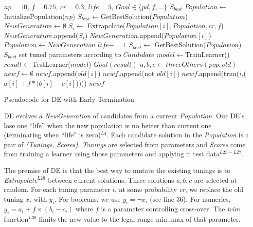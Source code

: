 \begin{algorithm}[!t]
\scriptsize
\begin{algorithmic}[1]
\Require $\mathit{np} = 10$, $f=0.75$, $cr=0.3$, $\mathit{life} = 5$, $\mathit{Goal} \in \{\mathit{pd},f,...\}$
\Ensure $S_{best}$
\vspace{2mm}
 \State $Population  \gets $ InitializePopulation($\mathit{np}$)   
 \State $S_{best} \gets $GetBestSolution($Population $)
\State $NewGeneration \gets \emptyset$
\State $S_i \gets$ Extrapolate($Population [i], Population , cr, f$)
\State $NewGeneration$.append($S_i$)
\Else
\State $NewGeneration$.append($Population [i]$)
\EndIf
\EndFor
\State $Population  \gets NewGeneration$
\State $life -=1$
\EndIf
\State $S_{best} \gets$ GetBestSolution($Population $)
 \EndWhile
\State \Return $S_{best}$
\EndFunction
{}
   \State set tuned parameters according to $Candidate$
   \State $model \gets$TrainLearner()
   \State $result \gets$TestLearner($model$)   
   \State \Return$\mathit{Goal}(result)$  
\EndFunction
{}
  \State $a, b, c\gets threeOthers(pop,old)$  
  \State $newf \gets \emptyset$
         \State $newf$.append($old[i]$)
                \Else
                    \State $newf$.append(not $old[i]$)
         \Else
          \State $newf$.append(trim($i$,($a[i] + f * (b[i] - c[i]$)))) 
         \EndIf
       \EndIf
  \EndFor
 \State \Return $newf$
\EndFunction
        \end{algorithmic} 
\caption{Pseudocode for DE with Early Termination}
\label{alg:DE}
\end{algorithm}

DE evolves a {\em NewGeneration} of candidates  from
a current {\em Population}.  Our DE's lose one ``life''
when the new population is no better than  current one (terminating when ``life'' is zero)$^{L4}$.
Each candidate solution in the {\em Population}  
is a pair of {\em (Tunings, Scores)}.  {\em Tunings} are selected from
{parameters} and {\em Scores} come from training a learner using those parameters
and applying it     test data$^{L23-L27}$.

The premise of DE  is that the best way to mutate the existing tunings
is to {\em Extrapolate}$^{L28}$
between current solutions.  Three solutions $a,b,c$ are selected at random.
For each tuning parameter $i$, at some probability {\em cr}, we replace
the old tuning $x_i$ with $y_i$. For booleans, we use $y_i= \neg x_i$ (see line 36). For numerics, $y_i = a_i+f \times (b_i - c_i)$   where $f$ is a parameter
controlling  cross-over.  The {\em trim} function$^{L38}$ limits the new
value to the legal range min..max of that parameter.
 
